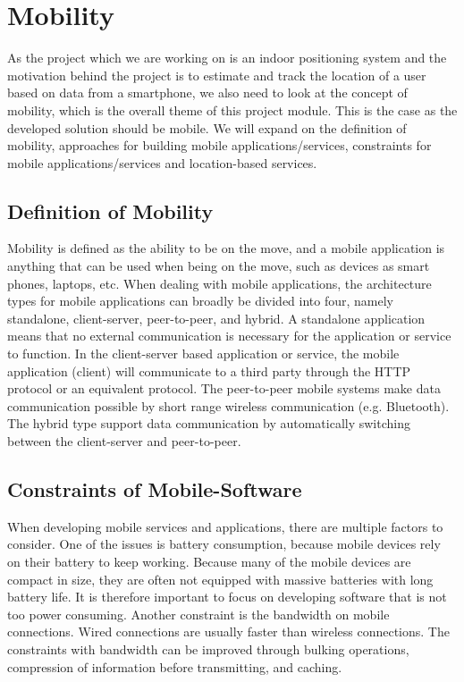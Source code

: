 \section{Mobility}

As the project which we are working on is an indoor positioning system and the motivation behind the project is to estimate and track the location of a user based on data from a smartphone, we also need to look at the concept of mobility, which is the overall theme of this project module. This is the case as the developed solution should be mobile. We will expand on the definition of mobility, approaches for building mobile applications/services, constraints for mobile applications/services and location-based services.

\subsection{Definition of Mobility}
Mobility is defined as the ability to be on the move, and a mobile application is anything that can be used when being on the move, such as devices as smart phones, laptops, etc. When dealing with mobile applications, the architecture types for mobile applications can broadly be divided into four, namely standalone, client-server, peer-to-peer, and hybrid. A standalone application means that no external communication is necessary for the application or service to function. In the client-server based application or service, the mobile application (client) will communicate to a third party through the HTTP protocol or an equivalent protocol. The peer-to-peer mobile systems make data communication possible by short range wireless communication (e.g. Bluetooth). The hybrid type support data communication by automatically switching between the client-server and peer-to-peer.\cite{mallick2003mobile}

\subsection{Constraints of Mobile-Software}

When developing mobile services and applications, there are multiple factors to consider. One of the issues is battery consumption, because mobile devices rely on their battery to keep working. Because many of the mobile devices are compact in size, they are often not equipped with massive batteries with long battery life. It is therefore important to focus on developing software that is not too power consuming. Another constraint is the bandwidth on mobile connections. Wired connections are usually faster than wireless connections. The constraints with bandwidth can be improved through bulking operations, compression of information before transmitting, and caching.\cite{mobileconstraints}


